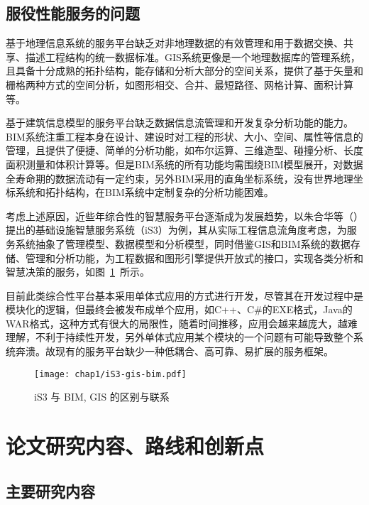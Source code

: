 \subsection{服役性能服务的问题}

基于地理信息系统的服务平台缺乏对非地理数据的有效管理和用于数据交换、共享、描述工程结构的统一数据标准。GIS系统更像是一个地理数据库的管理系统，且具备十分成熟的拓扑结构，能存储和分析大部分的空间关系，提供了基于矢量和栅格两种方式的空间分析，如图形相交、合并、最短路径、网格计算、面积计算等。

基于建筑信息模型的服务平台缺乏数据信息流管理和开发复杂分析功能的能力。BIM系统注重工程本身在设计、建设时对工程的形状、大小、空间、属性等信息的管理，且提供了便捷、简单的分析功能，如布尔运算、三维造型、碰撞分析、长度面积测量和体积计算等。但是BIM系统的所有功能均需围绕BIM模型展开，对数据全寿命期的数据流动有一定约束，另外BIM采用的直角坐标系统，没有世界地理坐标系统和拓扑结构，在BIM系统中定制复杂的分析功能困难。

考虑上述原因，近些年综合性的智慧服务平台逐渐成为发展趋势，以朱合华等（\citeyear{朱合华2018智慧基础设施}）提出的基础设施智慧服务系统（iS3）为例，其从实际工程信息流角度考虑，为服务系统抽象了管理模型、数据模型和分析模型，同时借鉴GIS和BIM系统的数据存储、管理和分析功能，为工程数据和图形引擎提供开放式的接口，实现各类分析和智慧决策的服务，如图~\ref{fig:iS3-gis-bim}~所示。

目前此类综合性平台基本采用单体式应用的方式进行开发，尽管其在开发过程中是模块化的逻辑，但最终会被发布成单个应用，如C++、C\#的EXE格式，Java的WAR格式，这种方式有很大的局限性，随着时间推移，应用会越来越庞大，越难理解，不利于持续性开发，另外单体式应用某个模块的一个问题有可能导致整个系统奔溃。故现有的服务平台缺少一种低耦合、高可靠、易扩展的服务框架。

\begin{figure}[!h]
	\centering
	\texttt{[image: chap1/iS3-gis-bim.pdf]}
	\caption{iS3 与 BIM, GIS 的区别与联系}
	\label{fig:iS3-gis-bim}
\end{figure}

\section{论文研究内容、路线和创新点}

\subsection{主要研究内容}

